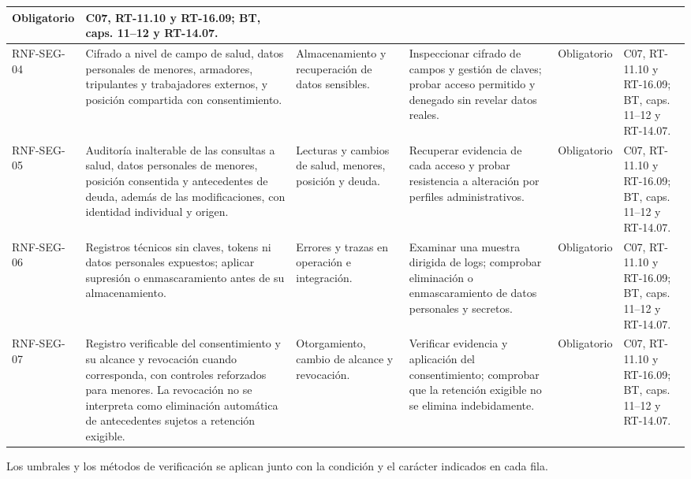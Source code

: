 \begin{longtable}{|L{0.096774\AnchoTablaAnexo}|L{0.298387\AnchoTablaAnexo}|L{0.133065\AnchoTablaAnexo}|L{0.233871\AnchoTablaAnexo}|L{0.076613\AnchoTablaAnexo}|L{0.161290\AnchoTablaAnexo}|}
Obligatorio &
C07, RT-11.10 y RT-16.09; BT, caps. 11–12 y RT-14.07. \\ \hline
RNF-SEG-04 &
Cifrado a nivel de campo de salud, datos personales de menores, armadores, tripulantes y trabajadores externos, y posición compartida con consentimiento. &
Almacenamiento y recuperación de datos sensibles. &
Inspeccionar cifrado de campos y gestión de claves; probar acceso permitido y denegado sin revelar datos reales. &
Obligatorio &
C07, RT-11.10 y RT-16.09; BT, caps. 11–12 y RT-14.07. \\ \hline
{}
RNF-SEG-05 &
Auditoría inalterable de las consultas a salud, datos personales de menores, posición consentida y antecedentes de deuda, además de las modificaciones, con identidad individual y origen. &
Lecturas y cambios de salud, menores, posición y deuda. &
Recuperar evidencia de cada acceso y probar resistencia a alteración por perfiles administrativos. &
Obligatorio &
C07, RT-11.10 y RT-16.09; BT, caps. 11–12 y RT-14.07. \\ \hline
RNF-SEG-06 &
Registros técnicos sin claves, tokens ni datos personales expuestos; aplicar supresión o enmascaramiento antes de su almacenamiento. &
Errores y trazas en operación e integración. &
Examinar una muestra dirigida de logs; comprobar eliminación o enmascaramiento de datos personales y secretos. &
Obligatorio &
C07, RT-11.10 y RT-16.09; BT, caps. 11–12 y RT-14.07. \\ \hline
{}
RNF-SEG-07 &
Registro verificable del consentimiento y su alcance y revocación cuando corresponda, con controles reforzados para menores. La revocación no se interpreta como eliminación automática de antecedentes sujetos a retención exigible. &
Otorgamiento, cambio de alcance y revocación. &
Verificar evidencia y aplicación del consentimiento; comprobar que la retención exigible no se elimina indebidamente. &
Obligatorio &
C07, RT-11.10 y RT-16.09; BT, caps. 11–12 y RT-14.07. \\ \hline
\end{longtable}

Los umbrales y los métodos de verificación se aplican junto con la condición y el carácter indicados en cada fila.

